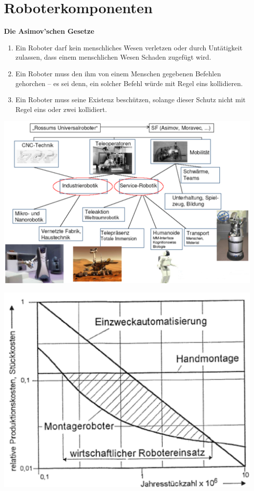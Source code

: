\section{Roboterkomponenten}
\textbf{Die Asimov’schen Gesetze}
\begin{enumerate}
    \item Ein Roboter darf kein menschliches Wesen verletzen oder durch Untätigkeit zulassen, dass einem menschlichen Wesen Schaden zugefügt wird.
    \item Ein Roboter muss den ihm von einem Menschen gegebenen Befehlen gehorchen – es sei denn, ein solcher Befehl würde mit Regel eins kollidieren.
    \item Ein Roboter muss seine Existenz beschützen, solange dieser Schutz nicht mit Regel eins oder zwei kollidiert.
\end{enumerate}
\begin{minipage}{0.5\linewidth}
\end{minipage}
\begin{minipage}{0.5\linewidth}
    \includegraphics[width=\linewidth]{./bilder/RoboAnwendung}
\end{minipage}
\begin{minipage}{0.5\linewidth}
    \includegraphics[width=0.9\linewidth]{./bilder/RoboWirtsch}
\end{minipage}
